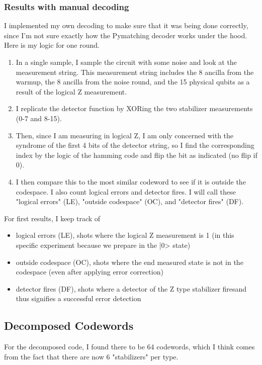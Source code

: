 \documentclass{article}
\begin{document}
\subsubsection{Results with manual decoding}
I implemented my own decoding to make sure that it was being done correctly, since I'm not sure exactly how the Pymatching decoder works under the hood. Here is my logic for one round.
\begin{enumerate}
    \item In a single sample, I sample the circuit with some noise and look at the measurement string. This measurement string includes the 8 ancilla from the warmup, the 8 ancilla from the noise round, and the 15 physical qubits as a result of the logical Z measurement.
    \item I replicate the detector function by XORing the two stabilizer measurements (0-7 and 8-15).
    \item Then, since I am measuring in logical Z, I am only concerned with the syndrome of the first 4 bits of the detector string, so I find the corresponding index by the logic of the hamming code and flip the bit as indicated (no flip if 0).
    \item I then compare this to the most similar codeword to see if it is outside the codespace. I also count logical errors and detector fires. I will call these "logical errors" (LE), "outside codespace" (OC), and "detector fires" (DF).
\end{enumerate}
For first results, I keep track of
\begin{itemize}
    \item logical errors (LE), shots where the logical Z measurement is 1 (in this specific experiment because we prepare in the |0> state)
    \item outside codespace (OC), shots where the end measured state is not in the codespace (even after applying error correction)
    \item detector fires (DF), shots where a detector of the Z type stabilizer firesand thus signifies a successful error detection 
\end{itemize}

\subsection{Decomposed Codewords}
For the decomposed code, I found there to be 64 codewords, which I think comes from the fact that there are now 6 "stabilizers" per type. 
\end{document}
